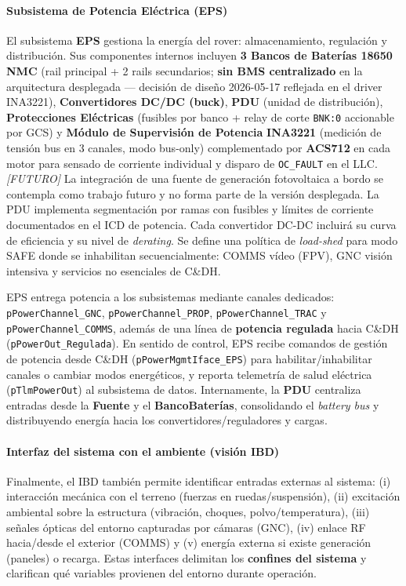 \paragraph{Subsistema de Potencia Eléctrica (EPS)}
El subsistema \textbf{EPS} gestiona la energía del rover: almacenamiento, regulación y distribución. Sus componentes internos incluyen \textbf{3 Bancos de Baterías 18650 NMC} (rail principal + 2 rails secundarios; \textbf{sin BMS centralizado} en la arquitectura desplegada --- decisión de diseño 2026-05-17 reflejada en el driver INA3221), \textbf{Convertidores DC/DC (buck)}, \textbf{PDU} (unidad de distribución), \textbf{Protecciones Eléctricas} (fusibles por banco + relay de corte \texttt{BNK:0} accionable por GCS) y \textbf{Módulo de Supervisión de Potencia} \textbf{INA3221} (medición de tensión bus en 3 canales, modo bus-only) complementado por \textbf{ACS712} en cada motor para sensado de corriente individual y disparo de \texttt{OC\_FAULT} en el LLC. \textit{[FUTURO]} La integración de una fuente de generación fotovoltaica a bordo se contempla como trabajo futuro y no forma parte de la versión desplegada. La PDU implementa segmentación por ramas con fusibles y límites de corriente documentados en el ICD de potencia. Cada convertidor DC-DC incluirá su curva de eficiencia y su nivel de \emph{derating}. Se define una política de \emph{load-shed} para modo SAFE donde se inhabilitan secuencialmente: COMMS vídeo (FPV), GNC visión intensiva y servicios no esenciales de C\&DH.

EPS entrega potencia a los subsistemas mediante canales dedicados: \texttt{pPowerChannel\_GNC}, \texttt{pPowerChannel\_PROP}, \texttt{pPowerChannel\_TRAC} y \texttt{pPowerChannel\_COMMS}, además de una línea de \textbf{potencia regulada} hacia C\&DH (\texttt{pPowerOut\_Regulada}). En sentido de control, EPS recibe comandos de gestión de potencia desde C\&DH (\texttt{pPowerMgmtIface\_EPS}) para habilitar/inhabilitar canales o cambiar modos energéticos, y reporta telemetría de salud eléctrica (\texttt{pTlmPowerOut}) al subsistema de datos. Internamente, la \textbf{PDU} centraliza entradas desde la \textbf{Fuente} y el \textbf{BancoBaterías}, consolidando el \textit{battery bus} y distribuyendo energía hacia los convertidores/reguladores y cargas.

\paragraph{Interfaz del sistema con el ambiente (visión IBD)}
Finalmente, el IBD también permite identificar entradas externas al sistema: (i) interacción mecánica con el terreno (fuerzas en ruedas/suspensión), (ii) excitación ambiental sobre la estructura (vibración, choques, polvo/temperatura), (iii) señales ópticas del entorno capturadas por cámaras (GNC), (iv) enlace RF hacia/desde el exterior (COMMS) y (v) energía externa si existe generación (paneles) o recarga. Estas interfaces delimitan los \textbf{confines del sistema} y clarifican qué variables provienen del entorno durante operación.

